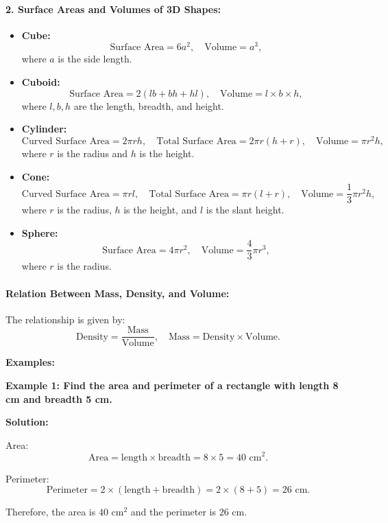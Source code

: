 \paragraph{2. Surface Areas and Volumes of 3D Shapes:}
\begin{itemize}
	\item \textbf{Cube:}
	\[
	\text{Surface Area} = 6a^2, \quad \text{Volume} = a^3,
	\]
	where $a$ is the side length.
	\item \textbf{Cuboid:}
	\[
	\text{Surface Area} = 2(lb + bh + hl), \quad \text{Volume} = l \times b \times h,
	\]
	where $l, b, h$ are the length, breadth, and height.
	\item \textbf{Cylinder:}
	\[
	\text{Curved Surface Area} = 2\pi rh, \quad \text{Total Surface Area} = 2\pi r(h + r), \quad \text{Volume} = \pi r^2h,
	\]
	where $r$ is the radius and $h$ is the height.
	\item \textbf{Cone:}
	\[
	\text{Curved Surface Area} = \pi rl, \quad \text{Total Surface Area} = \pi r(l + r), \quad \text{Volume} = \frac{1}{3}\pi r^2h,
	\]
	where $r$ is the radius, $h$ is the height, and $l$ is the slant height.
	\item \textbf{Sphere:}
	\[
	\text{Surface Area} = 4\pi r^2, \quad \text{Volume} = \frac{4}{3}\pi r^3,
	\]
	where $r$ is the radius.
\end{itemize}

\paragraph{Relation Between Mass, Density, and Volume:}
The relationship is given by:
\[
\text{Density} = \frac{\text{Mass}}{\text{Volume}}, \quad \text{Mass} = \text{Density} \times \text{Volume}.
\]

\textbf{Examples:}

\begin{flushleft}
	\textbf{Example 1: Find the area and perimeter of a rectangle with length 8 cm and breadth 5 cm.}
	
	\vspace{0.5cm}
	\textbf{Solution:}
	\vspace{0.5cm}
	
	Area:
	\[
	\text{Area} = \text{length} \times \text{breadth} = 8 \times 5 = 40 \text{ cm}^2.
	\]
	
	Perimeter:
	\[
	\text{Perimeter} = 2 \times (\text{length} + \text{breadth}) = 2 \times (8 + 5) = 26 \text{ cm}.
	\]
	
	Therefore, the area is $40 \text{ cm}^2$ and the perimeter is $26 \text{ cm}$.
\end{flushleft}

